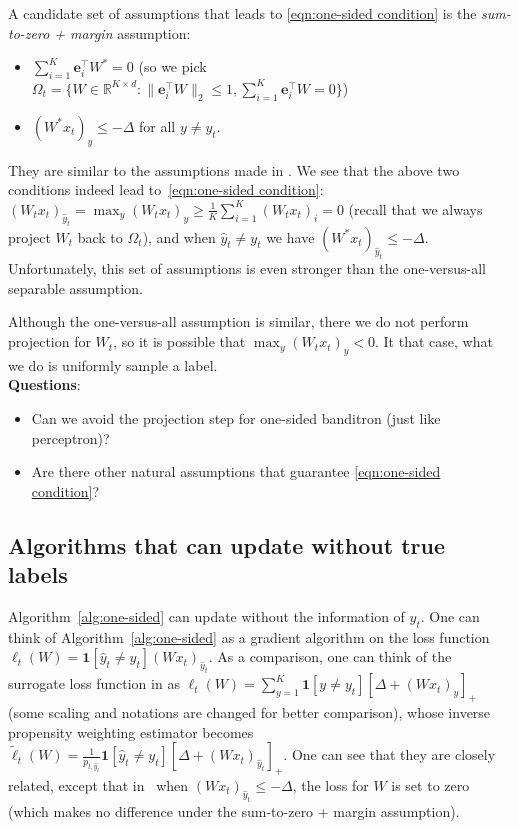 \documentclass{article}
\newcommand{\one}{\boldsymbol{1}}
\newcommand{\e}{\mathbf{e}}
\begin{document}
A candidate set of assumptions that leads to \eqref{eqn:one-sided condition} is the \textit{sum-to-zero + margin} assumption: 
\begin{itemize}
    \item $\sum_{i=1}^K \e_i^\top W^* = 0$ (so we pick $\Omega_t = \{W\in \mathbb{R}^{K\times d}: \|\e_i^\top W\|_2\leq 1, \sum_{i=1}^K \e_i^\top W=0\}$) \\
    \item $ (W^*x_t)_y \leq -\Delta $ for all $y\neq y_t$. 
\end{itemize}
They are similar to the assumptions made in \cite{2018arXiv180610745F}. We see that the above two conditions indeed lead to~\eqref{eqn:one-sided condition}: $(W_tx_t)_{\hat{y}_t} = \max_y (W_tx_t)_y \geq \frac{1}{K}\sum_{i=1}^K (W_tx_t)_i =0 $ (recall that we always project $W_t$ back to $\Omega_t$), and when $\hat{y}_t\neq y_t$ we have $(W^*x_t)_{\hat{y}_t}\leq -\Delta$. Unfortunately, this set of assumptions is even stronger than the one-versus-all separable assumption. 

Although the one-versus-all assumption is similar, there we do not perform projection for $W_t$, so it is possible that $\max_y (W_tx_t)_y < 0$. It that case, what we do is uniformly sample a label.\\

\textbf{Questions}:
\begin{itemize}
\item Can we avoid the projection step for one-sided banditron (just like perceptron)?
\item Are there other natural assumptions that guarantee \eqref{eqn:one-sided condition}? 
\end{itemize}

\subsection{Algorithms that can update without true labels}
Algorithm~\ref{alg:one-sided} can update without the information of $y_t$. One can think of Algorithm~\ref{alg:one-sided} as a gradient algorithm  on the loss function $\ell_t(W) = \one[\hat{y}_t\neq y_t](Wx_t)_{\hat{y}_t}$. As a comparison, one can think of the surrogate loss function in \cite{2018arXiv180610745F} as $\ell_t(W)=\sum_{y=1}^K \one[y\neq y_t][\Delta+(Wx_t)_y]_+ $ (some scaling and notations are changed for better comparison), whose inverse propensity weighting estimator becomes $\tilde{\ell}_t(W)= \frac{1}{p_{t,\hat{y}_t}}\one[\hat{y}_t\neq y_t][\Delta+(Wx_t)_{
\hat{y}_t}]_+$. One can see that they are closely related, except that in~\cite{2018arXiv180610745F}
when $(Wx_t)_{\hat{y}_t}\leq -\Delta$, the loss for $W$ is set to zero (which makes no difference under the sum-to-zero + margin assumption). 
\end{document}
